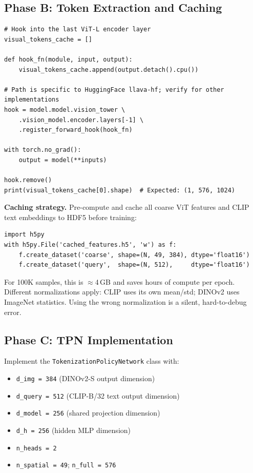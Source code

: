 \documentclass[12pt,a4paper]{article}
\begin{document}
\subsection{Phase B: Token Extraction and Caching}

\begin{lstlisting}[caption={Forward hook to intercept ViT-L output tokens.}]
# Hook into the last ViT-L encoder layer
visual_tokens_cache = []

def hook_fn(module, input, output):
    visual_tokens_cache.append(output.detach().cpu())

# Path is specific to HuggingFace llava-hf; verify for other implementations
hook = model.model.vision_tower \
    .vision_model.encoder.layers[-1] \
    .register_forward_hook(hook_fn)

with torch.no_grad():
    output = model(**inputs)

hook.remove()
print(visual_tokens_cache[0].shape)  # Expected: (1, 576, 1024)
\end{lstlisting}

\begin{implbox}
  \textbf{Caching strategy.} Pre-compute and cache all coarse ViT features and
  CLIP text embeddings to HDF5 before training:
  \begin{lstlisting}[numbers=none]
import h5py
with h5py.File('cached_features.h5', 'w') as f:
    f.create_dataset('coarse', shape=(N, 49, 384), dtype='float16')
    f.create_dataset('query',  shape=(N, 512),     dtype='float16')
  \end{lstlisting}
  For 100K samples, this is $\approx$4\,GB and saves hours of compute per epoch.
  Different normalizations apply: CLIP uses its own mean/std; DINOv2 uses ImageNet
  statistics. Using the wrong normalization is a silent, hard-to-debug error.
\end{implbox}

\subsection{Phase C: TPN Implementation}

Implement the \texttt{TokenizationPolicyNetwork} class with:
\begin{itemize}[leftmargin=2em]
  \item \texttt{d\_img = 384} (DINOv2-S output dimension)
  \item \texttt{d\_query = 512} (CLIP-B/32 text output dimension)
  \item \texttt{d\_model = 256} (shared projection dimension)
  \item \texttt{d\_h = 256} (hidden MLP dimension)
  \item \texttt{n\_heads = 2}
  \item \texttt{n\_spatial = 49}; \texttt{n\_full = 576}
\end{itemize}
\end{document}
